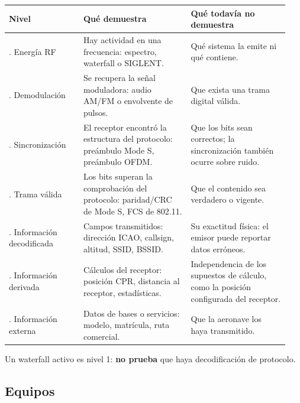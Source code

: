 \begin{longtable}{@{}>{\raggedright\arraybackslash}p{0.25\linewidth}>{\raggedright\arraybackslash}p{0.36\linewidth}>{\raggedright\arraybackslash}p{0.33\linewidth}@{}}
\toprule
\textbf{Nivel} & \textbf{Qué demuestra} & \textbf{Qué todavía no demuestra} \\
\midrule
\endhead
1. Energía RF & Hay actividad en una frecuencia: espectro, waterfall o SIGLENT. & Qué sistema la emite ni qué contiene. \\
2. Demodulación & Se recupera la señal moduladora: audio AM/FM o envolvente de pulsos. & Que exista una trama digital válida. \\
3. Sincronización & El receptor encontró la estructura del protocolo: preámbulo Mode S, preámbulo OFDM. & Que los bits sean correctos; la sincronización también ocurre sobre ruido. \\
4. Trama válida & Los bits superan la comprobación del protocolo: paridad/CRC de Mode S, FCS de 802.11. & Que el contenido sea verdadero o vigente. \\
5. Información decodificada & Campos transmitidos: dirección ICAO, callsign, altitud, SSID, BSSID. & Su exactitud física: el emisor puede reportar datos erróneos. \\
6. Información derivada & Cálculos del receptor: posición CPR, distancia al receptor, estadísticas. & Independencia de los supuestos de cálculo, como la posición configurada del receptor. \\
7. Información externa & Datos de bases o servicios: modelo, matrícula, ruta comercial. & Que la aeronave los haya transmitido. \\
\bottomrule
\end{longtable}

Un waterfall activo es nivel 1: \textbf{no prueba} que haya decodificación de protocolo.

\subsection{Equipos}

